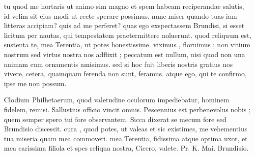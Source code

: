  tu quod me hortaris ut animo sim magno et spem habeam reciperandae salutis, id velim sit eius modi ut recte sperare possimus. nunc miser quando tuas iam litteras accipiam? quis ad me perferet? quas ego exspectassem Brundisi, si esset licitum per nautas, qui tempestatem praetermittere noluerunt. quod reliquum est, sustenta te, mea Terentia, ut potes honestissime. viximus , floruimus ; non vitium nostrum sed virtus nostra nos adflixit ; peccatum est nullum, nisi quod non una animam cum ornamentis amisimus. sed si hoc fuit liberis nostris gratius nos vivere, cetera, quamquam ferenda non sunt, feramus. atque ego, qui te confirmo, ipse me non possum.

 Clodium Philhetaerum, quod valetudine oculorum impediebatur, hominem fidelem, remisi. Sallustius officio vincit omnis. Pescennius est perbenevolus nobis ; quem semper spero tui fore observantem. Sicca dixerat se mecum fore sed Brundisio discessit. cura , quod potes, ut valeas et sic existimes, me vehementius tua miseria quam mea commoveri. mea Terentia, fidissima atque optima uxor, et mea carissima filiola et spes reliqua nostra, Cicero, valete. Pr. K. Mai. Brundisio.

